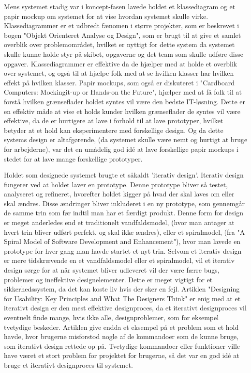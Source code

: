 \documentclass[10pt,a4paper,danish]{article}
\begin{document}
Mens systemet stadig var i koncept-fasen lavede holdet et klassediagram og et papir mockup om systemet for at vise 
hvordan systemet skulle virke. Klassediagrammer er et udbredt fænomen i større projekter, som er beskrevet i bogen 
"Objekt Orienteret Analyse og Design", som er brugt til at give et samlet overblik over problemområdet, hvilket 
er nyttigt for dette system da systemet skulle kunne holde styr på skibet, opgaverne og det team som skulle 
udføre disse opgaver. Klassediagrammer er effektive da de hjælper med at holde et overblik over systemet, og 
også til at hjælpe folk med at se hvilken klasser har hvilken effekt på hvilken klasser. Papir mockups, som også 
er diskuteret i "Cardboard Computers: Mockingit-up or Hands-on the Future", hjælper med at få folk til at forstå 
hvilken grænseflader holdet syntes vil være den bedste IT-løsning. Dette er en effektiv måde at vise et holds kunder 
hvilken grænseflader de syntes vil være effektive, da de er hurtigere at lave i forhold til at lave prototyper, hvilket 
betyder at et hold kan eksperimentere med forskellige design. Og da dette systems design er altafgørende, (da systemet 
skulle være nemt og hurtigt at bruge for arbejderne), var det en umådelig god idé at lave forskellige papir mockups i stedet 
for at lave mange forskellige prototyper.

Holdet som designede systemet brugte et såkaldt 'iterativ design'. Iterativ design fungerer ved at holdet 
laver en prototype. Denne prototype bliver så testet, analyseret og refineret, hvorefter holdet kigger 
på hvad der skal laves om eller skal ændres. Disse ændringer bliver inkluderet i en ny prototype, som gennemgår 
de samme trin som før indtil man har et færdigt produkt. Denne form for design er meget anderledes end et 
traditionelt vandfaldsmodel, (hvor man antager at hvert trin bliver udført perfekt, og skal ikke ændres), eller et 
spiralmodel, (fra "A Spiral Model of Software Development and Enhancement"), hvor man lavede en prototype  
for hver gang man havde startet et nyt trin. Selvom et iterativ design er mere tidskrævende en et 
vandfaldsmodel eller et spiralmodel, vil et iterativ design sørge for at når systemet bliver udleveret 
vil der være færre bugs, problemer og ineffektive designelementer. Dette er meget vigtigt for et sikkerhedssystem, 
da det kan koste liv hvis der sker en fejl. Artiklen "Designing for Usability: Key Principles and What The Designers 
Think" er enig med at et iterativt design er den mest effektive designproces, da et iterativt designproces vil eventuelt 
finde mange, hvis ikke alle, designproblemer, som for eksempel tvetydige beskeder. Artiklen give endda et eksempel 
på et problem som et hold havde, hvor brugerne misforstod nogle af de kommandoer som de kunne bruge, som iterativt design 
rettede op på. Tvetydige kommandoer eller funktioner ville have været et stort problem for projektet for brugerne, så 
det var en god idé at bruge et iterativt designproces til systemet.
\end{document}

